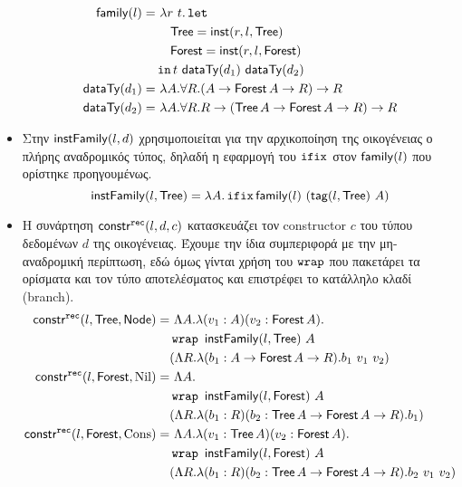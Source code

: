 \begin{itemize}
    \begin{align*}
    \dtFamily{l} =&\ \lambda r\ t . \tlet \\
        &\quad\Tree = \dtInst{r}{l}{\Tree}\\
        &\quad\Forest = \dtInst{r}{l}{\Forest}\\
      &\tin t\ \scottTy{d_1}\ \scottTy{d_2}\\
    \scottTy{d_1} =&\ \lambda A . \forall R . (A \rightarrow \Forest A \rightarrow R) \rightarrow R\\
    \scottTy{d_2} =&\ \lambda A . \forall R . R \rightarrow (\Tree A \rightarrow \Forest A \rightarrow R) \rightarrow R
    \end{align*}
  \item Στην $\dtInstFinal{l}{d}$ χρησιμοποιείται για την αρχικοποίηση της οικογένειας ο πλήρης
  αναδρομικός τύπος, δηλαδή η εφαρμογή του $\ifix$ στον $\dtFamily{l}$ που ορίστηκε προηγουμένως.
    $$\dtInstFinal{l}{\Tree} = \lambda A . \ifix \dtFamily{l}\ (\dtTag{l}{\Tree}\ A)$$
  \item Η συνάρτηση $\constrRec{l}{d}{c}$ κατασκευάζει τον constructor $c$ του τύπου δεδομένων $d$
  της οικογένειας. Έχουμε την ίδια συμπεριφορά με την μη-αναδρομική περίπτωση, εδώ όμως γίνται
  χρήση του $\wrap$ που πακετάρει τα ορίσματα και τον τύπο αποτελέσματος και επιστρέφει το
  κατάλληλο κλαδί (branch).
    \begin{align*}
    \constrRec{l}{\Tree}{\Node} =&\ \Lambda A . \lambda (v_1 : A) (v_2 : \Forest A) .\\
                               &\wrap\ \dtInstFinal{l}{\Tree}\ A\\
                               &(\Lambda R . \lambda (b_1 : A \rightarrow \Forest A \rightarrow R) . b_1\ v_1\ v_2)\\
    \constrRec{l}{\Forest}{\NNil} =&\ \Lambda A . \\
                               &\wrap\ \dtInstFinal{l}{\Forest}\ A\\
                               &(\Lambda R . \lambda (b_1 : R) (b_2 : \Tree A \rightarrow \Forest A \rightarrow R) . b_1)\\
      \constrRec{l}{\Forest}{\CCons} =&\ \Lambda A . \lambda (v_1 : \Tree A) (v_2 : \Forest A) . \\
                               &\wrap\ \dtInstFinal{l}{\Forest}\ A\\
                               &(\Lambda R . \lambda (b_1 : R) (b_2 : \Tree A \rightarrow \Forest A \rightarrow R) . b_2\ v_1\ v_2)
    \end{align*}

\end{itemize}

